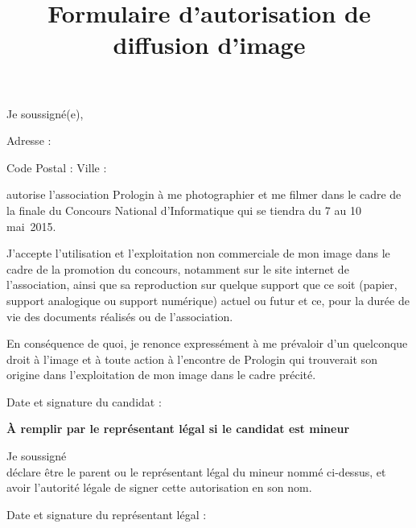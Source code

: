 \documentclass[a4paper,11pt]{prologin}
\title{Formulaire d'autorisation de diffusion d'image}
\begin{document}
Je soussigné(e), \dotfill

Adresse :\dotfill

Code Postal : \dotfill  Ville : \dotfill

autorise l'association Prologin à me photographier et me filmer dans
le cadre de la finale du Concours National d'Informatique qui se tiendra du 7 au 10 mai~2015.

J'accepte l'utilisation et l'exploitation non commerciale de mon
image dans le cadre de la promotion du concours, notamment sur le site internet
de l'association, ainsi que sa reproduction sur quelque support que ce soit
(papier, support analogique ou support numérique) actuel ou futur et ce, pour la
durée de vie des documents réalisés ou de l'association.

En conséquence de quoi, je renonce expressément à me prévaloir d'un
quelconque droit à l'image et à toute action à l'encontre de Prologin qui
trouverait son origine dans l'exploitation de mon image dans le cadre précité.

Date et signature du candidat :\vspace\baselineskip

\textbf{À remplir par le représentant légal si le candidat est mineur}

Je soussigné \dotfill\\
déclare être le parent ou le représentant légal du mineur nommé
ci-dessus, et avoir l'autorité légale de signer cette autorisation en son nom.

Date et signature du représentant légal :
\end{document}
